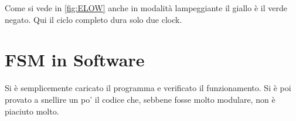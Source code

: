 \documentclass[a4paper,10pt]{article}
\begin{document}
Come si vede in \cref{fig:ELOW} anche in modalità lampeggiante il giallo è il verde negato. Qui il ciclo completo dura solo due clock.


\section{FSM in Software}

Si è semplicemente caricato il programma e verificato il funzionamento. Si è poi provato a snellire un po' il codice che, sebbene fosse molto modulare, non è piaciuto molto. 




\end{document}
